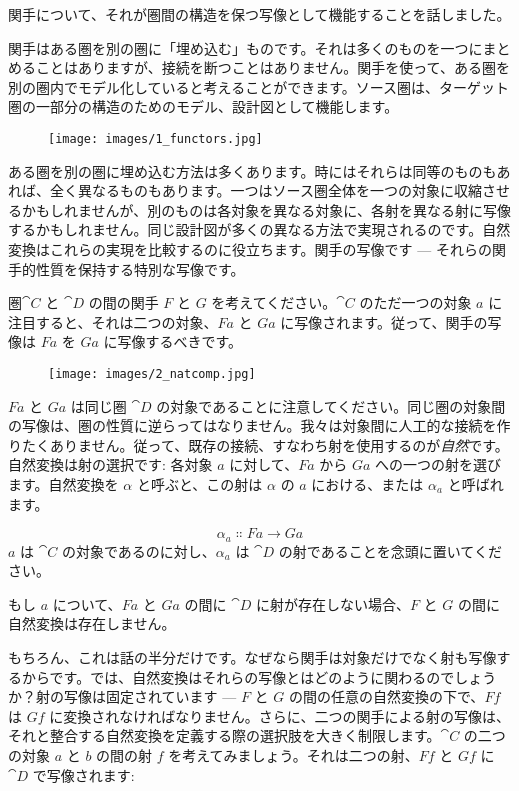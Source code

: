 
\lettrine[lhang=0.17]{関}{手}について、それが圏間の構造を保つ写像として機能することを話しました。

関手はある圏を別の圏に「埋め込む」ものです。それは多くのものを一つにまとめることはありますが、接続を断つことはありません。関手を使って、ある圏を別の圏内でモデル化していると考えることができます。ソース圏は、ターゲット圏の一部分の構造のためのモデル、設計図として機能します。

\begin{figure}[H]
  \centering\texttt{[image: images/1\_functors.jpg]}
\end{figure}

\noindent
ある圏を別の圏に埋め込む方法は多くあります。時にはそれらは同等のものもあれば、全く異なるものもあります。一つはソース圏全体を一つの対象に収縮させるかもしれませんが、別のものは各対象を異なる対象に、各射を異なる射に写像するかもしれません。同じ設計図が多くの異なる方法で実現されるのです。自然変換はこれらの実現を比較するのに役立ちます。関手の写像です --- それらの関手的性質を保持する特別な写像です。

圏$\cat{C}$ と $\cat{D}$ の間の関手 $F$ と $G$ を考えてください。$\cat{C}$ のただ一つの対象 $a$ に注目すると、それは二つの対象、$F a$ と $G a$ に写像されます。従って、関手の写像は $F a$ を $G a$ に写像するべきです。

\begin{figure}[H]
  \centering
  \texttt{[image: images/2\_natcomp.jpg]}
\end{figure}

\noindent
$F a$ と $G a$ は同じ圏 $\cat{D}$ の対象であることに注意してください。同じ圏の対象間の写像は、圏の性質に逆らってはなりません。我々は対象間に人工的な接続を作りたくありません。従って、既存の接続、すなわち射を使用するのが\emph{自然}です。自然変換は射の選択です: 各対象 $a$ に対して、$F a$ から $G a$ への一つの射を選びます。自然変換を $\alpha$ と呼ぶと、この射は $\alpha$ の $a$ における、または $\alpha_a$ と呼ばれます。

\[\alpha_a \Colon F a \to G a\]
$a$ は $\cat{C}$ の対象であるのに対し、$\alpha_a$ は $\cat{D}$ の射であることを念頭に置いてください。

もし $a$ について、$F a$ と $G a$ の間に $\cat{D}$ に射が存在しない場合、$F$ と $G$ の間に自然変換は存在しません。

もちろん、これは話の半分だけです。なぜなら関手は対象だけでなく射も写像するからです。では、自然変換はそれらの写像とはどのように関わるのでしょうか？射の写像は固定されています --- $F$ と $G$ の間の任意の自然変換の下で、$F f$ は $G f$ に変換されなければなりません。さらに、二つの関手による射の写像は、それと整合する自然変換を定義する際の選択肢を大きく制限します。$\cat{C}$ の二つの対象 $a$ と $b$ の間の射 $f$ を考えてみましょう。それは二つの射、$F f$ と $G f$ に $\cat{D}$ で写像されます: 

